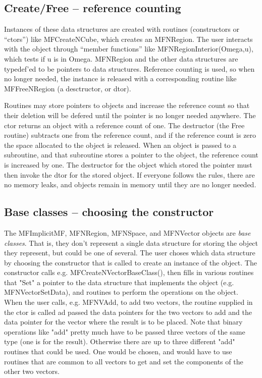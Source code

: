 \documentclass[12pt]{article}
\begin{document}
\subsection{Create/Free -- reference counting}

Instances of these data structures are created with routines (constructors or ``ctors'') like
{MFCreateNCube}, which creates an {MFNRegion}. The user interacts with the object 
through ``member functions'' like {MFNRegionInterior(Omega,u)}, which tests if {u} is
in Omega.  {MFNRegion} and the other data structures are typedef'ed to be pointers to data structures.
Reference counting is used, so when no longer needed, the instance is released with a corresponding routine
like {MFFreeNRegion} (a desctructor, or dtor).

Routines may store pointers to objects and increase the reference count so that their deletion will be
defered until the pointer is no longer needed anywhere. The ctor returns an object with a reference count of
one. The destructor (the Free routine) subtracts one from the reference count, and if the reference
count is zero the space allocated to the object is released. When an object is passed to a
subroutine, and that subroutine stores a pointer to the object, the reference count is increased
by one. The destructor for the object which stored the pointer must then invoke the dtor for the
stored object. If everyone follows the rules, there are no memory leaks, and objects remain
in memory until they are no longer needed.

\subsection{Base classes -- choosing the constructor}

The {MFImplicitMF}, {MFNRegion}, {MFNSpace}, and {MFNVector} objects are 
{\it base classes}. That is, they don't represent a single data structure for storing the 
object they represent, but could be one of several. The user choses which data structure 
by choosing the constructor that is called to create an instance of the object. The constructor
calls e.g. {MFCreateNVectorBaseClass()}, then fills in various routines that "Set" a pointer
to the data structure that implements the object (e.g. {MFNVectorSetData}), and routines
to perform the operations on the object. When the user calls, e.g. {MFNVAdd}, to add two
vectors, the routine supplied in the ctor is called ad passed the data pointers for the 
two vectors to add and the data pointer for the vector where the result is to be placed. Note
that binary operations like "add" pretty much have to be passed three vectors of the same type
(one is for the result). Otherwise there are up to three different "add" routines that could be 
used. One would be chosen, and would have to use routines that are common to all vectors to 
get and set the components of the other two vectors.
\end{document}
